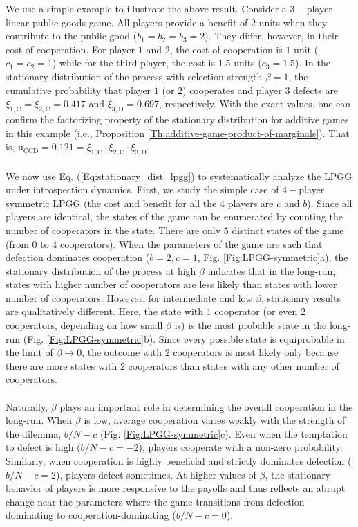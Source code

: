 \documentclass[11pt]{article}
\theoremstyle{plainCl1}
\theoremstyle{plainCl2}
\newcommand{\C}{\mathrm{C}}
\newcommand{\D}{\mathrm{D}}
\begin{document}
\noindent We use a simple example to illustrate the above result. Consider a $3-$player linear public goods game. All players provide a benefit of $2$ units when they contribute to the public good ($b_1 = b_2 = b_3 = 2$). They differ, however, in their cost of cooperation. For player $1$ and $2$, the cost of cooperation is $1$ unit ($c_1 = c_2 = 1$) while for the third player, the cost is $1.5$ units ($c_3 = 1.5$). In the stationary distribution of the process with selection strength $\beta = 1$, the cumulative probability that player $1$ (or $2$) cooperates and player $3$ defects are $\xi_{1,\C} = \xi_{2,\C}= 0.417$ and $\xi_{3,\D} = 0.697$, respectively. With the exact values, one can confirm the factorizing property of the stationary distribution for additive games in this example (i.e., Proposition \ref{Th:additive-game-product-of-marginals}). That is, $\mathrm{u}_{\C\C\D} = 0.121 = \xi_{1,\C} \cdot \xi_{2,\C} \cdot \xi_{3,\D}$. \\ \\
\noindent We now use Eq. (\ref{Eq:stationary_dist_lpgg}) to systematically analyze the LPGG under introspection dynamics. First, we study the simple case of $4-$player symmetric LPGG (the cost and benefit for all the $4$ players are $c$ and $b$). Since all players are identical, the states of the game can be enumerated by counting the number of cooperators in the state. There are only $5$ distinct states of the game (from $0$ to $4$ cooperators).
When the parameters of the game are such that defection dominates cooperation ($b = 2, c = 1$, Fig. \ref{Fig:LPGG-symmetric}a), the stationary distribution of the process at high $\beta$ indicates that in the long-run, states with higher number of cooperators are less likely than states with lower number of cooperators. However, for intermediate and low $\beta$, stationary results are qualitatively different. Here, the state with $1$ cooperator (or even $2$ cooperators, depending on how small $\beta$ is) is the most probable state in the long-run (Fig. \ref{Fig:LPGG-symmetric}b). Since every possible state is equiprobable in the limit of $\beta \to 0$, the outcome with $2$ cooperators is most likely only because there are more states with $2$ cooperators than states with any other number of cooperators. \\ \\
\noindent Naturally, $\beta$ plays an important role in determining the overall cooperation in the long-run. When $\beta$ is low, average cooperation varies weakly with the strength of the dilemma, $b/N - c$ (Fig. \ref{Fig:LPGG-symmetric}c). Even when the temptation to defect is high ($b/N - c = -2$), players cooperate with a non-zero probability. Similarly, when cooperation is highly beneficial and strictly dominates defection ($b/N - c = 2$), players defect sometimes. At higher values of $\beta$, the stationary behavior of players is more responsive to the payoffs and thus reflects an abrupt change near the parameters where the game transitions from defection-dominating to cooperation-dominating ($b/N - c = 0$).  \\ \\
\end{document}
